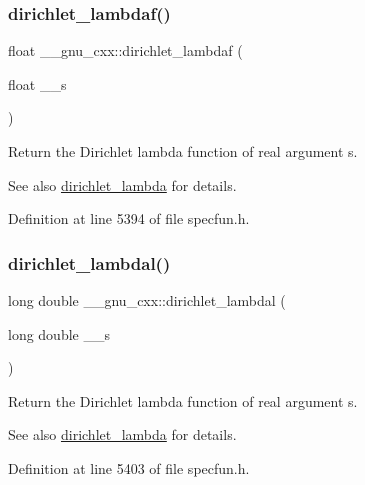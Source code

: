 \subsubsection{\texorpdfstring{dirichlet\+\_\+lambdaf()}{dirichlet\_lambdaf()}}
{\footnotesize\ttfamily float \+\_\+\+\_\+gnu\+\_\+cxx\+::dirichlet\+\_\+lambdaf (\begin{DoxyParamCaption}\item[{float}]{\+\_\+\+\_\+s }\end{DoxyParamCaption})\hspace{0.3cm}{\ttfamily [inline]}}

Return the Dirichlet lambda function of real argument {\ttfamily s}.

\begin{DoxySeeAlso}{See also}
\hyperlink{group__mathsf__gnu_ga06842a81bdcabf9c62252dde992d42ee}{dirichlet\+\_\+lambda} for details. 
\end{DoxySeeAlso}


Definition at line 5394 of file specfun.\+h.

\mbox{\label{group__mathsf__gnu_gab28d06c4e3c7457f1fa3663168678fb2}} 
\subsubsection{\texorpdfstring{dirichlet\+\_\+lambdal()}{dirichlet\_lambdal()}}
{\footnotesize\ttfamily long double \+\_\+\+\_\+gnu\+\_\+cxx\+::dirichlet\+\_\+lambdal (\begin{DoxyParamCaption}\item[{long double}]{\+\_\+\+\_\+s }\end{DoxyParamCaption})\hspace{0.3cm}{\ttfamily [inline]}}

Return the Dirichlet lambda function of real argument {\ttfamily s}.

\begin{DoxySeeAlso}{See also}
\hyperlink{group__mathsf__gnu_ga06842a81bdcabf9c62252dde992d42ee}{dirichlet\+\_\+lambda} for details. 
\end{DoxySeeAlso}


Definition at line 5403 of file specfun.\+h.

